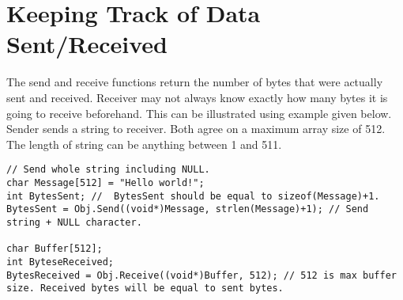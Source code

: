 \documentclass[12pt,a4paper]{article}
\begin{document}
\section{Keeping Track of Data Sent/Received}
The send and receive functions return the number of bytes that were actually sent and received. Receiver may not always know exactly how many bytes it is going to receive beforehand. This can be illustrated using example given below. Sender sends a string to receiver. Both agree on a maximum array size of 512. The length of string can be anything between 1 and 511.
\begin{lstlisting}
// Send whole string including NULL.
char Message[512] = "Hello world!";
int BytesSent; //  BytesSent should be equal to sizeof(Message)+1.
BytesSent = Obj.Send((void*)Message, strlen(Message)+1); // Send string + NULL character.

char Buffer[512];
int ByteseReceived;
BytesReceived = Obj.Receive((void*)Buffer, 512); // 512 is max buffer size. Received bytes will be equal to sent bytes.
\end{lstlisting}


\end{document}
